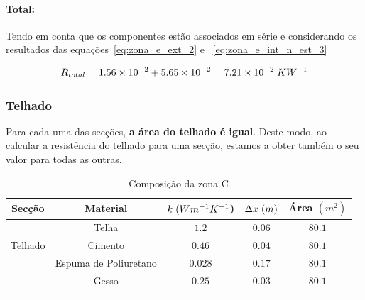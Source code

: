 \documentclass[12pt, a4paper]{article}
\begin{document}
\paragraph{Total:}\label{par:zona_e_total:} Tendo em conta que os componentes est\~ao
associados em série e considerando os resultados das
equa\c{c}\~oes~\ref{eq:zona_e_ext_2} e ~\ref{eq:zona_e_int_n_est_3}

\begin{equation}
	R_{total} =
			1.56 \times 10^{-2} + 5.65 \times 10^{-2} = 7.21 \times 10^{-2} \hspace{1mm} KW^{-1}
	\label{eq:zona_e_total}
\end{equation}



\subsubsection{Telhado}\label{ssub:Telhado}

Para cada uma das secções, \textbf{a área do telhado é igual}. Deste modo, ao calcular a resistência do telhado
para uma secção, estamos a obter também o seu valor para todas as outras.
\begin{table}[htpb]
	\begin{center}
		\begin{tabular}{c c c c c}
			\toprule{}
			Secção                     & Material               & $ k \hspace{1mm} (Wm^{-1}K^{-1}$) & $ \Delta x \hspace{1mm} (m)$ & Área $(m^2) $ \\
				\midrule{}

			\multirow{5}{*}{}          & Telha                  & $1.2$                             & $0.06$                       & $80.1$        \\
				\cline{2-5}
			Telhado                    & Cimento				& $0.46$                            & $0.04$                       & $80.1$        \\
				\cline{2-5}
			                           & Espuma de Poliuretano  & $0.028$                           & $0.17$                       & $80.1$        \\
				\cline{2-5}
									   & Gesso				 	& $0.25$                            & $0.03$                       & $80.1$        \\
			\bottomrule{}
		\end{tabular}
	\end{center}
	\caption{Composição da zona C}\label{tab:telhado}
\end{table}
\end{document}
